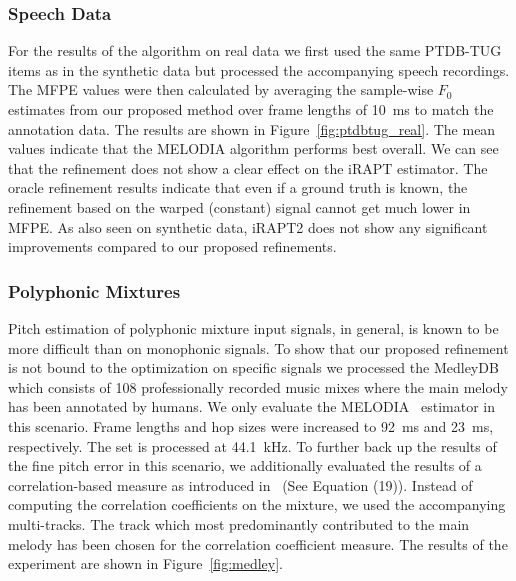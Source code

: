 \vspace{-0.6em}
\subsubsection{Speech Data} %
\label{ssub:speech}
For the results of the algorithm on real data we first used the same PTDB-TUG items as in the synthetic data but processed the accompanying speech recordings. The MFPE values were then calculated by averaging the sample-wise $F_0$ estimates from our proposed method over frame lengths of 10~ms to match the annotation data. The results are shown in Figure~\ref{fig:ptdbtug_real}. The mean values indicate that the MELODIA algorithm performs best overall. We can see that the refinement does not show a clear effect on the iRAPT estimator. The oracle refinement results indicate that even if a ground truth is known, the refinement based on the warped (constant) signal cannot get much lower in MFPE. As also seen on synthetic data, iRAPT2 does not show any significant improvements compared to our proposed refinements.

\vspace{-0.6em}
\subsubsection{Polyphonic Mixtures} %
\label{ssub:polyphonic}

Pitch estimation of polyphonic mixture input signals, in general, is known to be more difficult than on monophonic signals. To show that our proposed refinement is not bound to the optimization on specific signals we processed the \mbox{MedleyDB}~\cite{MedleyDB} which consists of 108 professionally recorded music mixes where the main melody has been annotated by humans. We only evaluate the MELODIA~\cite{salamon14} estimator in this scenario. Frame lengths and hop sizes were increased to 92~ms and 23~ms, respectively. The set is processed at 44.1~kHz. To further back up the results of the fine pitch error in this scenario, we additionally evaluated the results of a correlation-based measure as introduced in~\cite{resch07} (See Equation (19)). Instead of computing the correlation coefficients on the mixture, we used the accompanying multi-tracks. The track which most predominantly contributed to the main melody has been chosen for the correlation coefficient measure. The results of the experiment are shown in Figure~\ref{fig:medley}.

